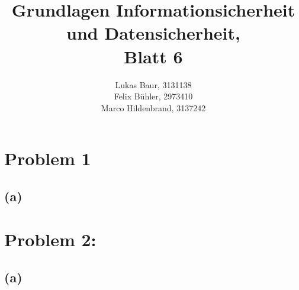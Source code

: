 \documentclass[10pt,pdftex,a4paper]{article}
\begin{document}
\title{ Grundlagen Informationsicherheit und Datensicherheit,\\ Blatt 6}
\author{Lukas Baur, 3131138\\
		Felix Bühler, 2973410\\
		Marco Hildenbrand, 3137242}
\maketitle
\section*{Problem 1}
\subsection*{(a)}


\newpage
\section*{Problem 2:}
\subsection*{(a)}


\newpage
\end{document}
